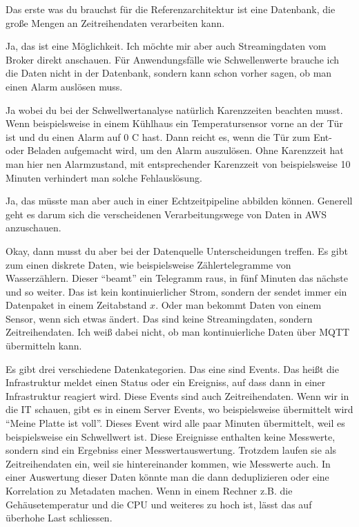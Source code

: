 \PE Das erste was du brauchst für die Referenzarchitektur ist eine Datenbank, die große Mengen an Zeitreihendaten verarbeiten kann.

\LF Ja, das ist eine Möglichkeit. Ich möchte mir aber auch Streamingdaten vom Broker direkt anschauen. Für Anwendungsfälle wie Schwellenwerte brauche ich die Daten nicht in der Datenbank, sondern kann schon vorher sagen, ob man einen Alarm auslösen muss.

\PE Ja wobei du bei der Schwellwertanalyse natürlich Karenzzeiten beachten musst. Wenn beispielsweise in einem Kühlhaus ein Temperatursensor vorne an der Tür ist und du einen Alarm auf 0 \textdegree{}C hast. Dann reicht es, wenn die Tür zum Ent- oder Beladen aufgemacht wird, um den Alarm auszulösen. Ohne Karenzzeit hat man hier nen Alarmzustand, mit entsprechender Karenzzeit von beispielsweise 10 Minuten verhindert man solche Fehlauslösung.

\LF Ja, das müsste man aber auch in einer Echtzeitpipeline abbilden können. Generell geht es darum sich die verscheidenen Verarbeitungswege von Daten in \ac{AWS} anzuschauen. 

\PE Okay, dann musst du aber bei der Datenquelle Unterscheidungen treffen. Es gibt zum einen diskrete Daten, wie beispielsweise Zählertelegramme von Wasserzählern. Dieser \enquote{beamt} ein Telegramm raus, in fünf Minuten das nächste und so weiter. Das ist kein kontinuierlicher Strom, sondern der sendet immer ein Datenpaket in einem Zeitabstand $x$. Oder man bekommt Daten von einem Sensor, wenn sich etwas ändert. Das sind keine Streamingdaten, sondern Zeitreihendaten. Ich weiß dabei nicht, ob man kontinuierliche Daten über \ac{MQTT} übermitteln kann.

Es gibt drei verschiedene Datenkategorien. Das eine sind Events. Das heißt die Infrastruktur meldet einen Status oder ein Ereigniss, auf dass dann in einer Infrastruktur reagiert wird. Diese Events sind auch Zeitreihendaten. Wenn wir in die IT schauen, gibt es in einem Server Events, wo beispielsweise übermittelt wird \enquote{Meine Platte ist voll}. Dieses Event wird alle paar Minuten übermittelt, weil es beispielsweise ein Schwellwert ist. Diese Ereignisse enthalten keine Messwerte, sondern sind ein Ergebniss einer Messwertauswertung. Trotzdem laufen sie als Zeitreihendaten ein, weil sie hintereinander kommen, wie Messwerte auch. In einer Auswertung dieser Daten könnte man die dann deduplizieren oder eine Korrelation zu Metadaten machen. Wenn in einem Rechner z.B. die Gehäusetemperatur und die CPU und weiteres zu hoch ist, lässt das auf überhohe Last schliessen. 

